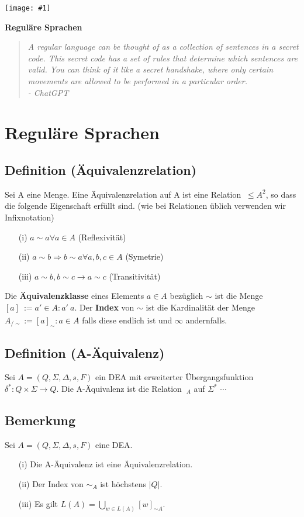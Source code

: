 \documentclass[a4paper,11pt]{article}
\newcommand{\coversection}[3]{
  \newpage
  \thispagestyle{empty}
  \begin{center}
    \vspace*{\fill}
    \texttt{[image: \#1]}
    \vspace*{0.5cm} %
    \par
    \Large\textbf{#2}
    \par\vspace{0.5cm} %
    \begin{quote}
      \itshape\small\raggedleft #3
    \end{quote}
    \par\vspace{\fill}
  \end{center}
  \newpage
}
\begin{document}
\coversection{regul.png}{Reguläre Sprachen}{A regular language can be thought of as a collection of sentences in a secret code. This secret code has a set of rules that determine which sentences are valid. You can think of it like a secret handshake, where only certain movements are allowed to be performed in a particular order.\\ \hspace*{\fill} - ChatGPT}
\section{Reguläre Sprachen}
\subsection{Definition (Äquivalenzrelation)} Sei A eine Menge. Eine Äquivalenzrelation auf A ist eine Relation $~ \leq A^{2}$, so dass die folgende Eigenschaft erfüllt sind. (wie bei Relationen üblich verwenden wir Infixnotation)
\begin{itemize}
    \item [(i)] $a \sim a \forall a \in A $ (Reflexivität)
    \item [(ii)] $a \sim b \Rightarrow  b \sim a \forall a, b, c \in A$ (Symetrie)
    \item [(iii)] $a \sim b, b \sim c \rightarrow a \sim c$ (Transitivität)
\end{itemize}
Die \textbf{Äquivalenzklasse} eines Elements $a \in A$ bezüglich $\sim$ ist die Menge $[a]_{~} := {a' \in A : a' ~a}$. Der \textbf{Index} von $\sim$ ist die Kardinalität der Menge $A_{/\sim} := {[a]_{\sim} : a \in A}$ falls diese endlich ist und $\infty$  andernfalls.

\subsection{Definition (A-Äquivalenz)} Sei $A = (Q, \Sigma, \Delta, s, F)$ ein DEA mit erweiterter Übergangsfunktion $\delta^{*}: Q \times \Sigma \rightarrow Q$. Die A-Äquivalenz ist die Relation $~_A$ auf $\Sigma^{*}$
$\cdots$

\subsection{Bemerkung} Sei $A = (Q, \Sigma, \Delta, s, F)$ eine DEA.
\begin{itemize}
    \item [(i)] Die A-Äquivalenz ist eine Äquivalenzrelation.
    \item [(ii)] Der Index von $\sim_{A}$ ist höchstens $|Q|$.
    \item [(iii)] Es gilt $L(A) = \bigcup \limits_{w \in L(A)} [w]_{\sim A}$.
\end{itemize}
\end{document}
